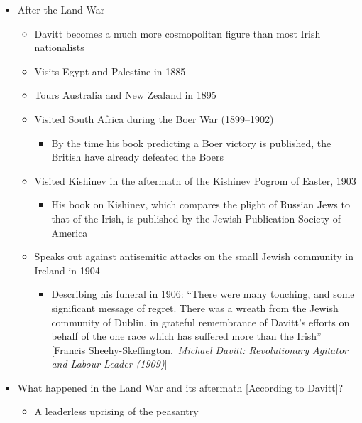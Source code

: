 \documentclass[12pt]{article}
\begin{document}
\begin{itemize}
\begin{itemize}
                \end{itemize}
                \item After the Land War
                \begin{itemize}
                    \item Davitt becomes a much more cosmopolitan figure than most Irish nationalists
                    \item Visits Egypt and Palestine in 1885
                    \item Tours Australia and New Zealand in 1895
                    \item Visited South Africa during the Boer War (1899--1902)
                    \begin{itemize}
                        \item By the time his book predicting a Boer victory is published, the British have already defeated the Boers
                    \end{itemize}
                    \item Visited Kishinev in the aftermath of the Kishinev Pogrom of Easter, 1903
                    \begin{itemize}
                        \item His book on Kishinev, which compares the plight of Russian Jews to that of the Irish, is published by the Jewish Publication Society of America
                    \end{itemize}
                    \item Speaks out against antisemitic attacks on the small Jewish community in Ireland in 1904
                    \begin{itemize}
                        \item Describing his funeral in 1906: ``There were many touching, and some significant message of regret. There was a wreath from the Jewish community of Dublin, in grateful remembrance of Davitt's efforts on behalf of the one race which has suffered more than the Irish'' [Francis Sheehy-Skeffington.\ \textit{Michael Davitt: Revolutionary Agitator and Labour Leader (1909)}]
                    \end{itemize}
                \end{itemize}
                \item What happened in the Land War and its aftermath [According to Davitt]?
                \begin{itemize}
                    \item A leaderless uprising of the peasantry

\end{itemize}
\end{itemize}
\end{document}
